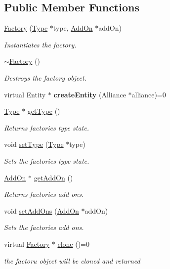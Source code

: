 \subsection*{Public Member Functions}
\begin{DoxyCompactItemize}
\item 
\hyperlink{classFactory_aca946f8877efb5b5bae700f74537d99d}{Factory} (\hyperlink{classType}{Type} $\ast$type, \hyperlink{classAddOn}{Add\+On} $\ast$add\+On)
\begin{DoxyCompactList}\small\item\em Instantiates the factory. \end{DoxyCompactList}\item 
\hyperlink{classFactory_a8f71456f48e4df402c778a44191ff40e}{$\sim$\+Factory} ()
\begin{DoxyCompactList}\small\item\em Destroys the factory object. \end{DoxyCompactList}\item 
\mbox{\label{classFactory_a80da95da98b407948dc815f2bca6a283}} 
virtual Entity $\ast$ {\bfseries create\+Entity} (Alliance $\ast$alliance)=0
\item 
\hyperlink{classType}{Type} $\ast$ \hyperlink{classFactory_ac91051006ace7ec5bb6ecf0fe6d02d58}{get\+Type} ()
\begin{DoxyCompactList}\small\item\em Returns factories type state. \end{DoxyCompactList}\item 
void \hyperlink{classFactory_a7484d514b094114231dbeb3df70e9d0b}{set\+Type} (\hyperlink{classType}{Type} $\ast$type)
\begin{DoxyCompactList}\small\item\em Sets the factories type state. \end{DoxyCompactList}\item 
\hyperlink{classAddOn}{Add\+On} $\ast$ \hyperlink{classFactory_a994153930f59cafb280e91d5b100b5aa}{get\+Add\+On} ()
\begin{DoxyCompactList}\small\item\em Returns factories add ons. \end{DoxyCompactList}\item 
void \hyperlink{classFactory_a58dbf2659ee06c61b2dae1a9a36fac53}{set\+Add\+Ons} (\hyperlink{classAddOn}{Add\+On} $\ast$add\+On)
\begin{DoxyCompactList}\small\item\em Sets the factories add ons. \end{DoxyCompactList}\item 
virtual \hyperlink{classFactory}{Factory} $\ast$ \hyperlink{classFactory_a00881ec5050751e4b747db5dfd266192}{clone} ()=0
\begin{DoxyCompactList}\small\item\em the factoru object will be cloned and returned \end{DoxyCompactList}\end{DoxyCompactItemize}


